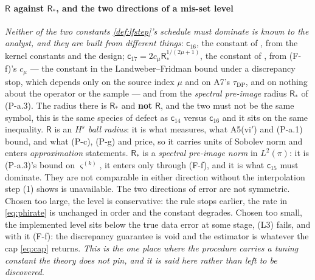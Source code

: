 \paragraph{$\mathsf R$ against $\mathsf R_\ast$, and the two directions of a mis-set level}

\emph{Neither of the two constants \cref{def:lfstep}'s schedule must dominate is known to the analyst,
and they are built from different things}: $\mathsf c_{16}$, the constant of , from
the kernel constants and the design; $\mathsf c_{17}=2c_\mu\mathsf R_\ast^{1/(2\mu+1)}$, the constant
of , from \textup{(F-f)}'s $c_\mu$ --- the constant in the Landweber--Fridman bound under
a discrepancy stop, which depends only on the source index $\mu$ and on A7's $\tau_{\mathrm{DP}}$, and
on nothing about the operator or the sample --- and from the \emph{spectral pre-image} radius
$\mathsf R_\ast$ of (P-a.3).
The radius there is $\mathsf R_\ast$ and \textbf{not} $\mathsf R$, and the two must not be the same
symbol, this is the same species of defect as $\mathsf c_{14}$ versus $\mathsf c_{16}$ and it sits on
the same inequality. $\mathsf R$ is an \emph{$H^{s}$ ball radius}: it is what 
measures, what A5(vi$'$) and (P-a.1) bound, and what (P-c), (P-g) and  price, so it
carries units of Sobolev norm and enters \emph{approximation} statements. $\mathsf R_\ast$ is a
\emph{spectral pre-image norm} in $L^{2}(\pi)$: it is (P-a.3)'s bound on $\varsigma^{(k)}$, it enters
only through (F-f), and it is what $\mathsf c_{15}$ must dominate. They are not comparable in
either direction without the interpolation step \textup{(1)} shows is unavailable.
The two directions of error are not symmetric. Chosen too large, the level is
conservative: the rule stops earlier, the rate in \eqref{eq:phirate} is unchanged in order and the
constant degrades. Chosen too small, the implemented level sits below the true data error
at some stage, (L3) fails, and with it (F-f): the discrepancy guarantee is void and the estimator is
whatever the cap \eqref{eq:cap} returns. \emph{This is the one place where the procedure carries a tuning constant the
theory does not pin, and it is said here rather than left to be discovered}.

